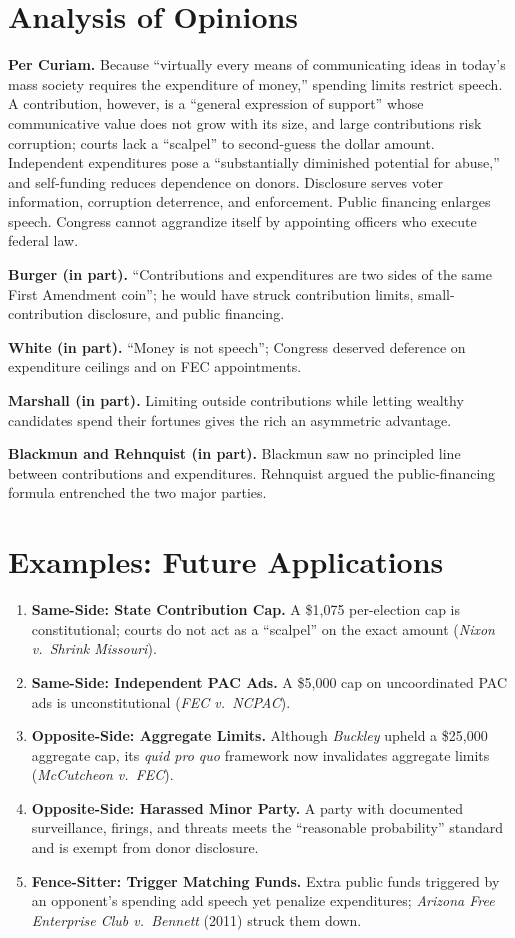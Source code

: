 \documentclass[12pt]{article}
\begin{document}
\section{Analysis of Opinions}

\textbf{Per Curiam.} Because ``virtually every means of communicating ideas in today's mass society requires the expenditure of money,'' spending limits restrict speech. A contribution, however, is a ``general expression of support'' whose communicative value does not grow with its size, and large contributions risk corruption; courts lack a ``scalpel'' to second-guess the dollar amount. Independent expenditures pose a ``substantially diminished potential for abuse,'' and self-funding reduces dependence on donors. Disclosure serves voter information, corruption deterrence, and enforcement. Public financing enlarges speech. Congress cannot aggrandize itself by appointing officers who execute federal law.

\textbf{Burger (in part).} ``Contributions and expenditures are two sides of the same First Amendment coin''; he would have struck contribution limits, small-contribution disclosure, and public financing.

\textbf{White (in part).} ``Money is not speech''; Congress deserved deference on expenditure ceilings and on FEC appointments.

\textbf{Marshall (in part).} Limiting outside contributions while letting wealthy candidates spend their fortunes gives the rich an asymmetric advantage.

\textbf{Blackmun and Rehnquist (in part).} Blackmun saw no principled line between contributions and expenditures. Rehnquist argued the public-financing formula entrenched the two major parties.

\section{Examples: Future Applications}

\begin{enumerate}
\item \textbf{Same-Side: State Contribution Cap.} A \$1,075 per-election cap is constitutional; courts do not act as a ``scalpel'' on the exact amount (\textit{Nixon v.\ Shrink Missouri}).
\item \textbf{Same-Side: Independent PAC Ads.} A \$5,000 cap on uncoordinated PAC ads is unconstitutional (\textit{FEC v.\ NCPAC}).
\item \textbf{Opposite-Side: Aggregate Limits.} Although \textit{Buckley} upheld a \$25,000 aggregate cap, its \textit{quid pro quo} framework now invalidates aggregate limits (\textit{McCutcheon v.\ FEC}).
\item \textbf{Opposite-Side: Harassed Minor Party.} A party with documented surveillance, firings, and threats meets the ``reasonable probability'' standard and is exempt from donor disclosure.
\item \textbf{Fence-Sitter: Trigger Matching Funds.} Extra public funds triggered by an opponent's spending add speech yet penalize expenditures; \textit{Arizona Free Enterprise Club v.\ Bennett} (2011) struck them down.
\end{enumerate}
\end{document}
